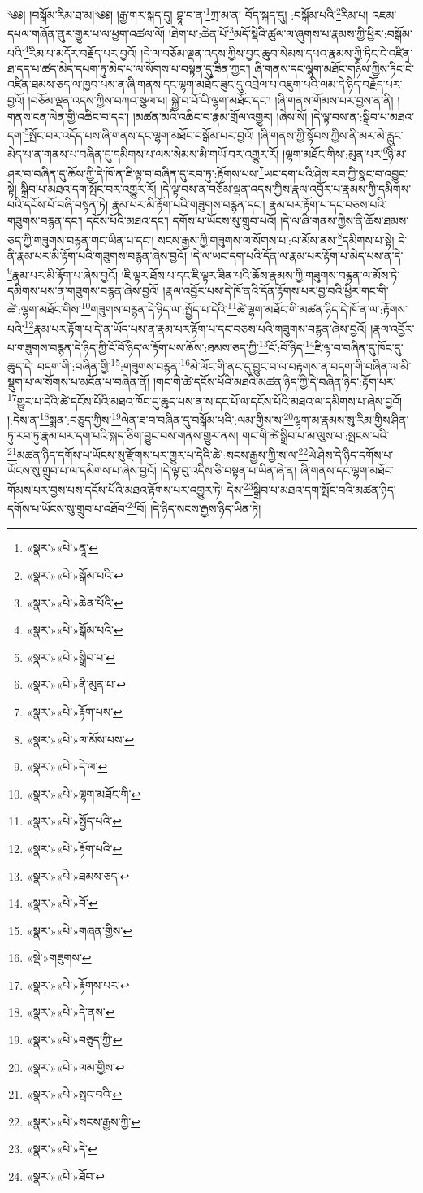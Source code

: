 ༄༅། །བསྒོམ་རིམ་ཐ་མ།༄༅། །རྒྱ་གར་སྐད་དུ། བྷཱ་བ་ན་\footnote{«སྣར་»«པེ་»ནཱ་}ཀྲ་མ་ན། བོད་སྐད་དུ། :བསྒོམ་པའི་\footnote{«སྣར་»«པེ་»སྒོམ་པའི་}རིམ་པ། འཇམ་དཔལ་གཞོན་ནུར་གྱུར་པ་ལ་ཕྱག་འཚལ་ལོ། །ཐེག་པ་:ཆེན་པོ་\footnote{«སྣར་»«པེ་»ཆེན་པོའི་}མདོ་སྡེའི་ཚུལ་ལ་ཞུགས་པ་རྣམས་ཀྱི་ཕྱིར་:བསྒོམ་པའི་\footnote{«སྣར་»«པེ་»སྒོམ་པའི་}རིམ་པ་མདོར་བརྗོད་པར་བྱའོ། །དེ་ལ་བཅོམ་ལྡན་འདས་ཀྱིས་བྱང་ཆུབ་སེམས་དཔའ་རྣམས་ཀྱི་ཏིང་ངེ་འཛིན་ཐ་དད་པ་ཚད་མེད་དཔག་ཏུ་མེད་པ་ལ་སོགས་པ་བསྟན་དུ་ཟིན་ཀྱང་། ཞི་གནས་དང་ལྷག་མཐོང་གཉིས་ཀྱིས་ཏིང་ངེ་འཛིན་ཐམས་ཅད་ལ་ཁྱབ་པས་ན་ཞི་གནས་དང་ལྷག་མཐོང་ཟུང་དུ་འབྲེལ་པ་འཇུག་པའི་ལམ་དེ་ཉིད་བརྗོད་པར་བྱའོ། །བཅོམ་ལྡན་འདས་ཀྱིས་བཀའ་སྩལ་པ། སྐྱེ་བ་པོ་ཡི་ལྷག་མཐོང་དང་། །ཞི་གནས་གོམས་པར་བྱས་ན་ནི། །གནས་ངན་ལེན་གྱི་འཆིང་བ་དང་། །མཚན་མའི་འཆིང་བ་རྣམ་གྲོལ་འགྱུར། །ཞེས་སོ། །དེ་ལྟ་བས་ན་:སྒྲིབ་པ་མཐའ་དག་\footnote{«སྣར་»«པེ་»སྒྲིབ་པ་}སྤོང་བར་འདོད་པས་ཞི་གནས་དང་ལྷག་མཐོང་བསྒོམ་པར་བྱའོ། །ཞི་གནས་ཀྱི་སྟོབས་ཀྱིས་ནི་མར་མེ་རླུང་མེད་པ་ན་གནས་པ་བཞིན་དུ་དམིགས་པ་ལས་སེམས་མི་གཡོ་བར་འགྱུར་རོ། །ལྷག་མཐོང་གིས་:མུན་པར་\footnote{«སྣར་»«པེ་»ནི་མུན་པ་}ཉི་མ་ཤར་བ་བཞིན་དུ་ཆོས་ཀྱི་དེ་ཁོ་ན་ཇི་ལྟ་བ་བཞིན་དུ་རབ་ཏུ་:རྟོགས་པས་\footnote{«སྣར་»«པེ་»རྟོག་པས་}ཡང་དག་པའི་ཤེས་རབ་ཀྱི་སྣང་བ་འབྱུང་སྟེ། སྒྲིབ་པ་མཐའ་དག་སྤོང་བར་འགྱུར་རོ། །དེ་ལྟ་བས་ན་བཅོམ་ལྡན་འདས་ཀྱིས་རྣལ་འབྱོར་པ་རྣམས་ཀྱི་དམིགས་པའི་དངོས་པོ་བཞི་བསྟན་ཏེ། རྣམ་པར་མི་རྟོག་པའི་གཟུགས་བརྙན་དང་། རྣམ་པར་རྟོག་པ་དང་བཅས་པའི་གཟུགས་བརྙན་དང་། དངོས་པོའི་མཐའ་དང་། དགོས་པ་ཡོངས་སུ་གྲུབ་པའོ། །དེ་ལ་ཞི་གནས་ཀྱིས་ནི་ཆོས་ཐམས་ཅད་ཀྱི་གཟུགས་བརྙན་གང་ཡིན་པ་དང་། སངས་རྒྱས་ཀྱི་གཟུགས་ལ་སོགས་པ་:ལ་མོས་ནས་\footnote{«སྣར་»«པེ་»ལ་མོས་པས་}དམིགས་པ་སྟེ། དེ་ནི་རྣམ་པར་མི་རྟོག་པའི་གཟུགས་བརྙན་ཞེས་བྱའོ། །དེ་ལ་ཡང་དག་པའི་དོན་ལ་རྣམ་པར་རྟོག་པ་མེད་པས་ན་དེ་\footnote{«སྣར་»«པེ་»དེ་ལ་}རྣམ་པར་མི་རྟོག་པ་ཞེས་བྱའོ། །ཇི་ལྟར་ཐོས་པ་དང་ཇི་ལྟར་ཟིན་པའི་ཆོས་རྣམས་ཀྱི་གཟུགས་བརྙན་ལ་མོས་ཏེ་དམིགས་པས་ན་གཟུགས་བརྙན་ཞེས་བྱའོ། །རྣལ་འབྱོར་པས་དེ་ཁོ་ནའི་དོན་རྟོགས་པར་བྱ་བའི་ཕྱིར་གང་གི་ཚེ་:ལྷག་མཐོང་གིས་\footnote{«སྣར་»«པེ་»ལྷག་མཐོང་གི་}གཟུགས་བརྙན་དེ་ཉིད་ལ་:སྤྱོད་པ་དེའི་\footnote{«སྣར་»«པེ་»སྤྱོད་པའི་}ཚེ་ལྷག་མཐོང་གི་མཚན་ཉིད་དེ་ཁོ་ན་ལ་:རྟོགས་པའི་\footnote{«སྣར་»«པེ་»རྟོག་པའི་}རྣམ་པར་རྟོག་པ་དེ་ན་ཡོད་པས་ན་རྣམ་པར་རྟོག་པ་དང་བཅས་པའི་གཟུགས་བརྙན་ཞེས་བྱའོ། །རྣལ་འབྱོར་པ་གཟུགས་བརྙན་དེ་ཉིད་ཀྱི་ངོ་བོ་ཉིད་ལ་རྟོག་པས་ཆོས་:ཐམས་ཅད་ཀྱི་\footnote{«སྣར་»«པེ་»ཐམས་ཅད་}ངོ་:བོ་ཉིད་\footnote{«སྣར་»«པེ་»བོ་}ཇི་ལྟ་བ་བཞིན་དུ་ཁོང་དུ་ཆུད་དེ། བདག་གི་:བཞིན་གྱི་\footnote{«སྣར་»«པེ་»གཞན་གྱིས་}:གཟུགས་བརྙན་\footnote{«སྡེ་»གཟུགས་}མེ་ལོང་གི་ནང་དུ་བྱུང་བ་ལ་བརྟགས་ན་བདག་གི་བཞིན་ལ་མི་སྡུག་པ་ལ་སོགས་པ་མངོན་པ་བཞིན་ནོ། །གང་གི་ཚེ་དངོས་པོའི་མཐའི་མཚན་ཉིད་ཀྱི་དེ་བཞིན་ཉིད་:རྟོག་པར་\footnote{«སྣར་»«པེ་»རྟོགས་པར་}གྱུར་པ་དེའི་ཚེ་དངོས་པོའི་མཐའ་ཁོང་དུ་ཆུད་པས་ན་ས་དང་པོ་ལ་དངོས་པོའི་མཐའ་ལ་དམིགས་པ་ཞེས་བྱའོ། །:དེས་ན་\footnote{«སྣར་»«པེ་»དེ་ནས་}སྨན་:བཅུད་ཀྱིས་\footnote{«སྣར་»«པེ་»བཅུད་ཀྱི་}ལེན་ཟ་བ་བཞིན་དུ་བསྒོམ་པའི་:ལམ་གྱིས་ས་\footnote{«སྣར་»«པེ་»ལམ་གྱིས་}ལྷག་མ་རྣམས་སུ་རིམ་གྱིས་ཤིན་ཏུ་རབ་ཏུ་རྣམ་པར་དག་པའི་སྐད་ཅིག་བྱུང་བས་གནས་གྱུར་ནས། གང་གི་ཚེ་སྒྲིབ་པ་མ་ལུས་པ་:སྤངས་པའི་\footnote{«སྣར་»«པེ་»སྤང་བའི་}མཚན་ཉིད་དགོས་པ་ཡོངས་སུ་རྫོགས་པར་གྱུར་པ་དེའི་ཚེ་:སངས་རྒྱས་ཀྱི་ས་ལ་\footnote{«སྣར་»«པེ་»སངས་རྒྱས་ཀྱི་}ཡེ་ཤེས་དེ་ཉིད་དགོས་པ་ཡོངས་སུ་གྲུབ་པ་ལ་དམིགས་པ་ཞེས་བྱའོ། །དེ་ལྟ་བུ་འདིས་ཅི་བསྟན་པ་ཡིན་ཞེ་ན། ཞི་གནས་དང་ལྷག་མཐོང་གོམས་པར་བྱས་པས་དངོས་པོའི་མཐའ་རྟོགས་པར་འགྱུར་ཏེ། དེས་\footnote{«སྣར་»«པེ་»དེ་}སྒྲིབ་པ་མཐའ་དག་སྤོང་བའི་མཚན་ཉིད་དགོས་པ་ཡོངས་སུ་གྲུབ་པ་འཐོབ་\footnote{«སྣར་»«པེ་»ཐོབ་}བོ། །དེ་ཉིད་སངས་རྒྱས་ཉིད་ཡིན་ཏེ། 